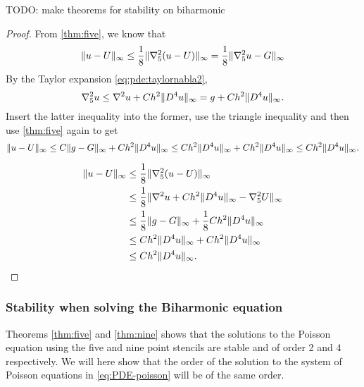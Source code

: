 \begin{theorem}
TODO: make theorems for stability on biharmonic
\end{theorem}
\begin{proof}
From \cref{thm:five}, we know that
\begin{equation*}
\lVert u-U \rVert_\infty \leq \frac18 \lVert \nabla_5^2(u-U) \rVert_\infty = \frac18 \lVert \nabla_5^2 u - G \rVert_\infty
\end{equation*}
By the Taylor expansion \ref{eq:pde:taylornabla2},
\begin{equation*}
\nabla_5^2 u \leq \nabla^2 u + Ch^2 \lVert D^4 u \rVert_\infty = g + Ch^2 \lVert D^4 u \rVert_\infty.
\end{equation*}
Insert the latter inequality into the former, use the triangle inequality and then use \cref{thm:five} again to get
\begin{equation*}
\lVert u-U \rVert_\infty \leq C \lVert g-G \rVert_\infty + Ch^2 \lVert D^4 u \rVert_\infty \leq Ch^2 \lVert D^4 u \rVert_\infty + Ch^2 \lVert D^4 u \rVert_\infty \leq Ch^2 \lVert D^4 u \rVert_\infty. \qedhere
\end{equation*}

\begin{equation*}
\begin{split}
\lVert u-U \rVert_\infty &\leq \frac18 \lVert \nabla_5^2(u-U) \rVert_\infty \\
            &\leq \frac18 \lVert \nabla^2 u + Ch^2 \lVert D^4 u \rVert_\infty - \nabla_5^2 U \rVert_\infty \\
			&\leq \frac18 \lVert g - G \rVert_\infty + \frac18 Ch^2 \lVert D^4 u \rVert_\infty \\
			&\leq C h^2 \lVert D^4 u \rVert_\infty + Ch^2 \lVert D^4 u \rVert_\infty \\
			&\leq C h^2 \lVert D^4 u \rVert_\infty.
\end{split}
\end{equation*}
\end{proof}

\subsubsection{Stability when solving the Biharmonic equation}
Theorems \ref{thm:five} and \ref{thm:nine} shows that the solutions to the Poisson equation using the five and nine point stencils are stable and of order 2 and 4 respectively.
We will here show that the order of the solution to the system of Poisson equations in \eqref{eq:PDE-poisson} will be of the same order.

